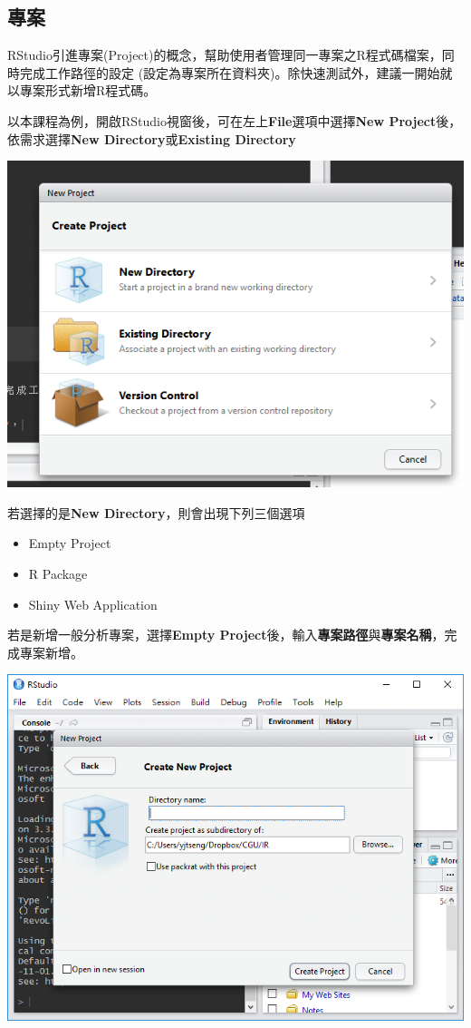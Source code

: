 \documentclass[]{book}
\providecommand{\tightlist}{%
  \setlength{\itemsep}{0pt}\setlength{\parskip}{0pt}}
\theoremstyle{definition}
\theoremstyle{definition}
\theoremstyle{remark}
\begin{document}
\subsection{專案}

RStudio引進專案(Project)的概念，幫助使用者管理同一專案之R程式碼檔案，同時完成工作路徑的設定
(設定為專案所在資料夾)。除快速測試外，建議一開始就以專案形式新增R程式碼。

以本課程為例，開啟RStudio視窗後，可在左上\textbf{File}選項中選擇\textbf{New
Project}後，依需求選擇\textbf{New Directory}或\textbf{Existing
Directory}

\includegraphics[width=8.22in]{figure/NewProject}

若選擇的是\textbf{New Directory}，則會出現下列三個選項

\begin{itemize}
\tightlist
\item
  Empty Project
\item
  R Package
\item
  Shiny Web Application
\end{itemize}

若是新增一般分析專案，選擇\textbf{Empty
Project}後，輸入\textbf{專案路徑}與\textbf{專案名稱}，完成專案新增。

\includegraphics[width=9.42in]{figure/NewProject1}
\end{document}
